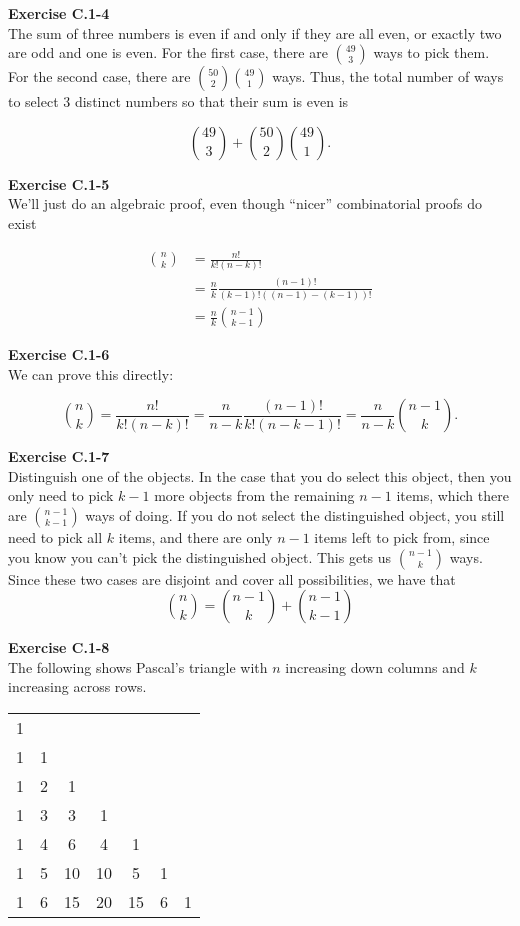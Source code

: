 \documentclass{article}
\begin{document}
\noindent\textbf{Exercise C.1-4}\\

The sum of three numbers is even if and only if they are all even, or exactly two are odd and one is even.  For the first case, there are ${49 \choose 3}$ ways to pick them.  For the second case, there are ${50 \choose 2} {49 \choose 1}$ ways.  Thus, the total number of ways to select 3 distinct numbers so that their sum is even is 

\[ {49 \choose 3} + {50 \choose 2}{49 \choose 1}.\]



\noindent\textbf{Exercise C.1-5}\\

We'll just do an algebraic proof, even though ``nicer'' combinatorial proofs do exist

\begin{align*}
\binom{n}{k} &= \frac{n!}{k!(n-k)!}\\
&= \frac{n}{k} \frac{(n-1)!}{(k-1)!((n-1)-(k-1))!}\\
&= \frac{n}{k} \binom{n-1}{k-1}
\end{align*}

\noindent\textbf{Exercise C.1-6}\\

We can prove this directly:

\[ {n \choose k} = \frac{n!}{k!(n-k)!} = \frac{n}{n-k}\frac{(n-1)!}{k!(n-k-1)!} = \frac{n}{n-k} {n-1 \choose k}.\]

\noindent\textbf{Exercise C.1-7}\\

Distinguish one of the objects. In the case that you do select this object, then you only need to pick $k-1$ more objects from the remaining $n-1$ items, which there are $\binom{n-1}{k-1}$ ways of doing. If you do not select the distinguished object, you still need to pick all $k$ items, and there are only $n-1$ items left to pick from, since you know you can't pick the distinguished object. This gets us $\binom{n-1}{k}$ ways. Since these two cases are disjoint and cover all possibilities, we have that 
\[
\binom{n}{k} = \binom{n-1}{k} + \binom{n-1}{k-1}
\]

\noindent\textbf{Exercise C.1-8}\\

The following shows Pascal's triangle with $n$ increasing down columns and $k$ increasing across rows. \\

\begin{tabular}{ccccccc}
1 &&&&&& \\
1 & 1 &&&&& \\
1 & 2 & 1 &&&& \\
1 & 3 & 3 & 1 &&& \\
1 & 4 & 6 & 4 & 1 &&\\
1 & 5  & 10 & 10 & 5 & 1 &\\
1 & 6 & 15 & 20 & 15 & 6 & 1
\end{tabular}\\
\end{document}
